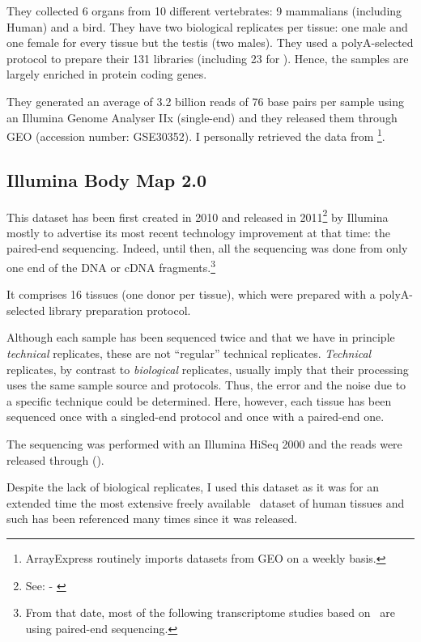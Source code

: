 They collected 6 organs from 10 different vertebrates:
9 mammalians (including Human) and a bird. They have two biological replicates
per tissue: one male and one female for every tissue but the testis (two males).
They used a polyA-selected protocol to prepare their 131 libraries (including 23
for ).
Hence, the samples are largely enriched in protein coding genes.

They generated an average of 3.2 billion reads of 76 base pairs per sample
using an Illumina Genome Analyser IIx (single-end) and they released them
through \gls{GEO} (accession number: GSE30352).
I personally retrieved the data from
\footnote{ArrayExpress routinely imports
datasets from \gls{GEO} on a weekly basis.}.


\subsection{Illumina Body Map 2.0}
This dataset has been first created in 2010 and released in
2011\footnote{See:  - \cite{ibmEnsembl}} by Illumina
mostly to advertise its most recent technology improvement at that time:
the paired-end sequencing. Indeed, until then, all the sequencing was done
from only one end of the \gls{DNA} or \gls{cDNA} fragments.\footnote{From that
date, most of the following transcriptome studies based on \Rnaseq\ are using
paired-end sequencing.}

It comprises 16 tissues (one donor per tissue), which were prepared with a
polyA-selected library preparation protocol.

Although each sample has been sequenced twice and that we have in principle
\emph{technical} replicates, these are not ``regular'' technical
replicates. \emph{Technical} replicates,
by contrast to \emph{biological} replicates,
usually imply that their processing uses the same sample source and protocols.
Thus, the error and the noise due to a specific technique could be determined.
Here, however, each tissue has been sequenced once with a singled-end protocol
and once with a paired-end one.

The sequencing was performed with an Illumina HiSeq 2000 and the reads were
released through  ().

Despite the lack of biological replicates, I used this dataset as it was for an
extended time the most extensive freely available \Rnaseq\ dataset of human
tissues and such has been referenced many times since it was released.

